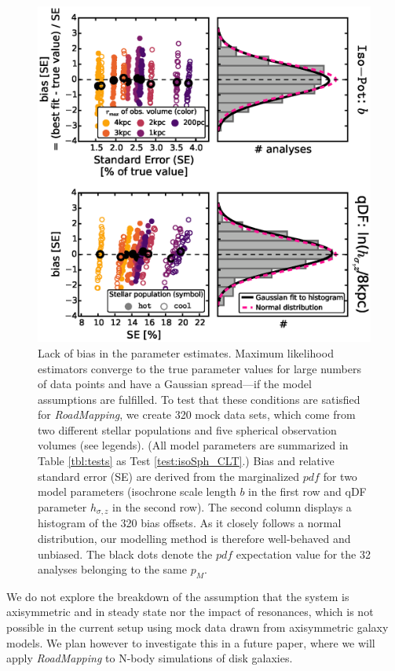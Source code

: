 \documentclass[iop,revtex4,numberedappendix,appendixfloats]{emulateapj}
\newcommand{\pdf}{\ensuremath{pdf}}
\newcommand{\pmodel}{\ensuremath{p_M}}
\newcommand{\RM}{{\sl RoadMapping}}
\begin{document}
\begin{figure}[!htbp]
\centering
\includegraphics[width=\columnwidth]{isoSph_CLT_2.eps}
\caption{Lack of bias in the parameter estimates. Maximum likelihood estimators converge to the true parameter values for large numbers of data points and have a Gaussian spread---if the model assumptions are fulfilled. To test that these conditions are satisfied for \RM{}, we create 320 mock data sets, which come from two different stellar populations and five spherical observation volumes (see legends). (All model parameters are summarized in Table \ref{tbl:tests} as Test \ref{test:isoSph_CLT}.) Bias and relative standard error (SE) are derived from the marginalized \pdf{} for two model parameters (isochrone scale length $b$ in the first row and qDF parameter $h_{\sigma,z}$ in the second row). The second column displays a histogram of the 320 bias offsets. As it closely follows a normal distribution, our modelling method is therefore well-behaved and unbiased. The black dots denote the \pdf{} expectation value for the 32 analyses belonging to the same $\pmodel{}$.}
\label{fig:isoSph_CLT}
\end{figure}

We do not explore the breakdown of the assumption that the system is axisymmetric and in steady state nor the impact of resonances, which is not possible in the current setup using mock data drawn from axisymmetric galaxy models. We plan however to investigate this in a future paper, where we will apply \RM{} to N-body simulations of disk galaxies.
\end{document}
